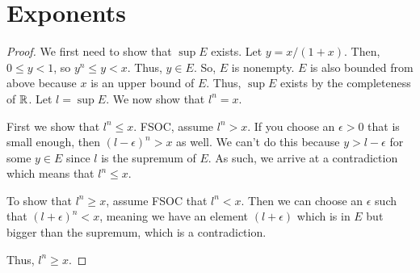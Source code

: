 \documentclass{report}
\begin{document}
\section{Exponents}
\begin{proof}
    We first need to show that $\sup E$ exists. Let $y = x / (1+x)$. Then, $0 \leq y < 1$, so $y^n \leq y < x$. Thus, $y \in E$. So, $E$ is nonempty. $E$ is also bounded from above because $x$ is an upper bound of $E$. Thus, $\sup E$ exists by the completeness of $\RR$. Let $l = \sup E$. We now show that $l^n = x$.

    First we show that $l^n \leq x$. FSOC, assume $l^n > x$. If you choose an $\epsilon > 0$ that is small enough, then $(l-\epsilon)^n > x$ as well. We can't do this because $y > l - \epsilon$ for some $y \in E$ since $l$ is the supremum of $E$. As such, we arrive at a contradiction which  means that $l^n \leq x$.

    To show that $l^n \geq x$, assume FSOC that $l^n < x$. Then we can choose an $\epsilon$ such that $(l + \epsilon)^n < x$, meaning we have an element $(l + \epsilon)$ which is in $E$ but bigger than the supremum, which is a contradiction. 
    
    Thus, $l^n \geq x$. 
\end{proof}
\end{document}
